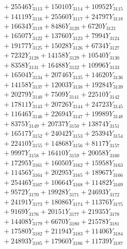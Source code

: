 \documentclass[a4paper,10pt]{article}
\begin{document}
{\begin{align}
&\;  + 25546 Y_{3113} + 15010 Y_{3114} + 10952 Y_{3115} \\[0.3ex]
&\;  + 14119 Y_{3116} + 25560 Y_{3117} + 24797 Y_{3118} \\[0.5ex]\allowbreak
&\;  + 16634 Y_{3119} + 8486 Y_{3120} + 6720 Y_{3121} \\[0.3ex]
&\;  + 16507 Y_{3122} + 13760 Y_{3123} + 7994 Y_{3124} \\[0.3ex]
&\;  + 19177 Y_{3125} + 15028 Y_{3126} + 6734 Y_{3127} \\[0.3ex]
&\;  + 7232 Y_{3128} + 14158 Y_{3129} + 10540 Y_{3130} \\[0.3ex]
&\;  + 8358 Y_{3131} + 16488 Y_{3132} + 10996 Y_{3133} \\[0.3ex]
&\;  + 16504 Y_{3134} + 20746 Y_{3135} + 14620 Y_{3136} \\[0.3ex]
&\;  + 14158 Y_{3137} + 12003 Y_{3138} + 19284 Y_{3139} \\[0.3ex]
&\;  + 20279 Y_{3140} + 7509 Y_{3141} + 22510 Y_{3142} \\[0.3ex]
&\;  + 17811 Y_{3143} + 20726 Y_{3144} + 24723 Y_{3145} \\[0.3ex]
&\;  + 11646 Y_{3146} + 22694 Y_{3147} + 19989 Y_{3148} \\[0.5ex]\allowbreak
&\;  + 8375 Y_{3149} + 20737 Y_{3150} + 13874 Y_{3151} \\[0.3ex]
&\;  + 16517 Y_{3152} + 24042 Y_{3153} + 25394 Y_{3154} \\[0.3ex]
&\;  + 22410 Y_{3155} + 14868 Y_{3156} + 8117 Y_{3157} \\[0.3ex]
&\;  + 9997 Y_{3158} + 16410 Y_{3159} + 20058 Y_{3160} \\[0.3ex]
&\;  + 17295 Y_{3161} + 16050 Y_{3162} + 15958 Y_{3163} \\[0.3ex]
&\;  + 11456 Y_{3164} + 20295 Y_{3165} + 18967 Y_{3166} \\[0.3ex]
&\;  + 25446 Y_{3167} + 10664 Y_{3168} + 11482 Y_{3169} \\[0.3ex]
&\;  + 9572 Y_{3170} + 19928 Y_{3171} + 24693 Y_{3172} \\[0.3ex]
&\;  + 24191 Y_{3173} + 18086 Y_{3174} + 11376 Y_{3175} \\[0.3ex]
&\;  + 9169 Y_{3176} + 20151 Y_{3177} + 21935 Y_{3178} \\[0.5ex]\allowbreak
&\;  + 14408 Y_{3179} + 6670 Y_{3180} + 21578 Y_{3181} \\[0.3ex]
&\;  + 17580 Y_{3182} + 21194 Y_{3183} + 11406 Y_{3184} \\[0.3ex]
&\;  + 24893 Y_{3185} + 17960 Y_{3186} + 11739 Y_{3187} \\[0.3ex]

\end{align}}
\end{document}
